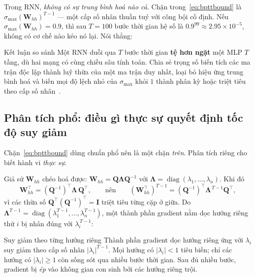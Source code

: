 Trong RNN, \emph{không có sự trung bình hoá nào cả}. Chặn
trong~\eqref{eq:bpttbound} là $\sigma_{\max}(\mathbf{W}_{hh})^{T-1}$ --- một cấp
số nhân thuần tuý với công bội cố định. Nếu
$\sigma_{\max}(\mathbf{W}_{hh}) = 0.9$, thì sau $T = 100$ bước thời gian hệ số là
$0.9^{99} \approx 2.95\times10^{-5}$, không có cơ chế nào kéo nó lại. Nói thẳng:

\begin{guidelinebox}{Kết luận so sánh}
Một RNN duỗi qua $T$ bước thời gian \textbf{tệ hơn ngặt} một MLP $T$ tầng, dù hai
mạng có cùng chiều sâu tính toán. Chia sẻ trọng số biến tích các ma trận độc lập
thành luỹ thừa của một ma trận duy nhất, loại bỏ hiệu ứng trung bình hoá và biến
mọi độ lệch nhỏ của $\sigma_{\max}$ khỏi $1$ thành phân kỳ hoặc triệt tiêu theo
cấp số nhân~\cite{BengioSimardFrasconi1994,Pascanu2013}.
\end{guidelinebox}

\subsection{Phân tích phổ: điều gì thực sự quyết định tốc độ suy giảm}

Chặn~\eqref{eq:bpttbound} dùng chuẩn phổ nên là một chặn \emph{trên}. Phân tích
riêng cho biết hành vi \emph{thực sự}.

Giả sử $\mathbf{W}_{hh}$ chéo hoá được:
$\mathbf{W}_{hh} = \mathbf{Q}\boldsymbol{\Lambda}\mathbf{Q}^{-1}$ với
$\boldsymbol{\Lambda} = \operatorname{diag}(\lambda_1,\dots,\lambda_n)$. Khi đó
\[
  \mathbf{W}_{hh}^{\top}
  = \left(\mathbf{Q}^{-1}\right)^{\!\top}\boldsymbol{\Lambda}\,\mathbf{Q}^{\top},
  \qquad\text{nên}\qquad
  \left(\mathbf{W}_{hh}^{\top}\right)^{T-1}
  = \left(\mathbf{Q}^{-1}\right)^{\!\top}\boldsymbol{\Lambda}^{\,T-1}\mathbf{Q}^{\top},
\]
vì các thừa số $\mathbf{Q}^{\top}(\mathbf{Q}^{-1})^{\top} = \mathbf{I}$ triệt tiêu
từng cặp ở giữa. Do $\boldsymbol{\Lambda}^{T-1} =
\operatorname{diag}(\lambda_1^{T-1},\dots,\lambda_n^{T-1})$, một thành phần
gradient nằm dọc hướng riêng thứ $i$ bị nhân đúng với $\lambda_i^{\,T-1}$:

\begin{infobox}{Suy giảm theo từng hướng riêng}
Thành phần gradient dọc hướng riêng ứng với $\lambda_i$ suy giảm theo cấp số nhân
$\left|\lambda_i\right|^{T-1}$. Mọi hướng có $|\lambda_i| < 1$ tiêu biến; chỉ các
hướng có $|\lambda_i|\ge1$ còn sống sót qua nhiều bước thời gian. Sau đủ nhiều
bước, gradient bị \emph{ép} vào không gian con sinh bởi các hướng riêng trội.
\end{infobox}

